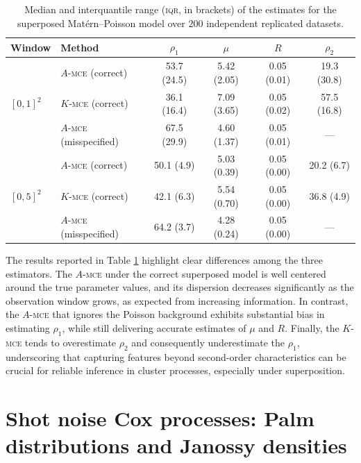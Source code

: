 \documentclass[11pt,a4paper,oneside]{article}
\theoremstyle{definition}
\theoremstyle{remark}
\begin{document}
\begin{table}[t]
	\centering
\begin{tabular}{llcccc}
Window & Method  & $\rho_1$ & $\mu$ & $R$ & $\rho_2$ \\
\midrule
\multirow{3}{*}{$[0,1]^2$}
& $A$-\textsc{mce} (correct)
& 53.7 (24.5) & 5.42 (2.05) & 0.05 (0.01) & 19.3 (30.8) \\
& $K$-\textsc{mce} (correct)
& 36.1 (16.4) & 7.09 (3.65) & 0.05 (0.02) & 57.5 (16.8) \\
& $A$-\textsc{mce} (misspecified)
& 67.5 (29.9) & 4.60 (1.37) & 0.05 (0.01) & --- \\
\midrule
\multirow{3}{*}{$[0,5]^2$}
& $A$-\textsc{mce} (correct)
& 50.1 (4.9) & 5.03 (0.39) & 0.05 (0.00) & 20.2 (6.7) \\
& $K$-\textsc{mce} (correct)
& 42.1 (6.3) & 5.54 (0.70) & 0.05 (0.00) & 36.8 (4.9) \\
& $A$-\textsc{mce} (misspecified)
& 64.2 (3.7) & 4.28 (0.24) & 0.05 (0.00) & --- \\
\end{tabular}
\caption{Median and interquantile range (\textsc{iqr}, in brackets) of the estimates for the superposed Mat\'ern--Poisson model over $200$ independent replicated
datasets.}
\label{tab:mce_A_K_two_windows}
\end{table}

The results reported in Table \ref{tab:mce_A_K_two_windows} highlight clear differences among the three estimators. The $A$-\textsc{mce} under the correct superposed model is well centered around the true parameter values, and its dispersion decreases significantly as the observation window grows, as expected from increasing information. In contrast, the $A$-\textsc{mce} that ignores the Poisson background exhibits substantial bias in estimating $\rho_1$, while still delivering accurate estimates of $\mu$ and $R$. Finally, the $K$-\textsc{mce} tends to overestimate $\rho_2$ and consequently underestimate the $\rho_1$, underscoring that capturing features beyond second-order characteristics can be crucial for reliable inference in cluster processes, especially under superposition.



\section{Shot noise Cox processes: Palm distributions and Janossy densities} \label{sec:sncp_inference}
\end{document}
